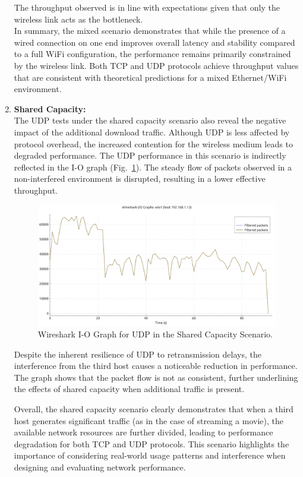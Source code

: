 \begin{enumerate}
    The throughput observed is in line with expectations given that only the wireless link acts as the bottleneck. \\

    In summary, the mixed scenario demonstrates that while the presence of a wired connection on one end improves overall latency and stability compared to a full WiFi configuration, the performance remains primarily constrained by the wireless link. Both TCP and UDP protocols achieve throughput values that are consistent with theoretical predictions for a mixed Ethernet/WiFi environment.
    
    \item \textbf{Shared Capacity:} \\
    The UDP tests under the shared capacity scenario also reveal the negative impact of the additional download traffic. Although UDP is less affected by protocol overhead, the increased contention for the wireless medium leads to degraded performance.
    The UDP performance in this scenario is indirectly reflected in the I-O graph (Fig.~\ref{fig:io-mitm-udp}). The steady flow of packets observed in a non-interfered environment is disrupted, resulting in a lower effective throughput.

    \begin{figure}[ht]
        \centering
        \includegraphics[width=0.9\columnwidth]{images/graphs/I-O/I-O_MIX_MITM_UDP.pdf}
        \caption{Wireshark I-O Graph for UDP in the Shared Capacity Scenario.}
        \label{fig:io-mitm-udp}
    \end{figure}

    Despite the inherent resilience of UDP to retransmission delays, the interference from the third host causes a noticeable reduction in performance. The graph shows that the packet flow is not as consistent, further underlining the effects of shared capacity when additional traffic is present.

    Overall, the shared capacity scenario clearly demonstrates that when a third host generates significant traffic (as in the case of streaming a movie), the available network resources are further divided, leading to performance degradation for both TCP and UDP protocols. This scenario highlights the importance of considering real-world usage patterns and interference when designing and evaluating network performance.

\end{enumerate}



